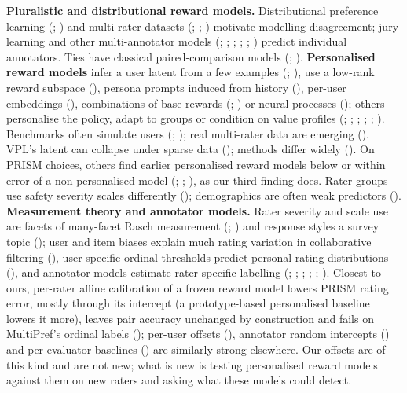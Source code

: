 \documentclass{article}
\begin{document}
\textbf{Pluralistic and distributional reward models.} Distributional preference learning (\citealp{siththaranjan2024dpl}; \citealp{zhang2025diverging}) and multi-rater datasets (\citealp{kirk2024prism}; \citealp{miranda2025hybrid}; \citealp{aroyo2023dices}) motivate modelling disagreement; jury learning and other multi-annotator models (\citealp{gordon2022jury}; \citealp{davani2022dealing}; \citealp{gordon2021deconvolution}; \citealp{kumar2021toxic}; \citealp{fleisig2023majority}; \citealp{homan2024intersectionality}) predict individual annotators. Ties have classical paired-comparison models (\citealp{rao1967ties}; \citealp{davidson1970ties}). \textbf{Personalised reward models} infer a user latent from a few examples (\citealp{poddar2024vpl}; \citealp{chen2025pal}), use a low-rank reward subspace (\citealp{bose2025lore}), persona prompts induced from history (\citealp{ryan2025synthesizeme}), per-user embeddings (\citealp{li2024prlhf}), combinations of base rewards (\citealp{shenfeld2025pref}; \citealp{luo2025pca}) or neural processes (\citealp{kobalczyk2024fewshot}); others personalise the policy, adapt to groups or condition on value profiles (\citealp{jang2023soups}; \citealp{feng2024modular}; \citealp{zhao2024gpo}; \citealp{chakraborty2024maxmin}; \citealp{park2024heterogeneous}; \citealp{sorensen2025valueprofiles}). Benchmarks often simulate users (\citealp{castricato2025persona}; \citealp{zollo2025personalllm}); real multi-rater data are emerging (\citealp{zhang2026community}). VPL's latent can collapse under sparse data (\citealp{kim2026swap}); methods differ widely (\citealp{dong2025personalization}). On PRISM choices, others find earlier personalised reward models below or within error of a non-personalised model (\citealp{rezk2025crisis}; \citealp{cai2026mrm}; \citealp{zhang2026pgenrm}), as our third finding does. Rater groups use safety severity scales differently (\citealp{mishra2026decoding}); demographics are often weak predictors (\citealp{orlikowski2023ecological}). \textbf{Measurement theory and annotator models.} Rater severity and scale use are facets of many-facet Rasch measurement (\citealp{linacre1989mfrm}; \citealp{eckes2011mfrm}) and response styles a survey topic (\citealp{baumgartner2001response}); user and item biases explain much rating variation in collaborative filtering (\citealp{koren2009mf}), user-specific ordinal thresholds predict personal rating distributions (\citealp{koren2011ordrec}), and annotator models estimate rater-specific labelling (\citealp{dawid1979em}; \citealp{raykar2010crowds}; \citealp{hovy2013mace}; \citealp{deng2023annotate}; \citealp{plank2022problem}; \citealp{uma2021learning}). Closest to ours, per-rater affine calibration of a frozen reward model lowers PRISM rating error, mostly through its intercept (a prototype-based personalised baseline lowers it more), leaves pair accuracy unchanged by construction and fails on MultiPref's ordinal labels (\citealp{raj2026pebs}); per-user offsets (\citealp{milkowski2021peb}), annotator random intercepts (\citealp{gantt2020mixed}) and per-evaluator baselines (\citealp{he2026personajudge}) are similarly strong elsewhere. Our offsets are of this kind and are not new; what is new is testing personalised reward models against them on new raters and asking what these models could detect.
\end{document}
